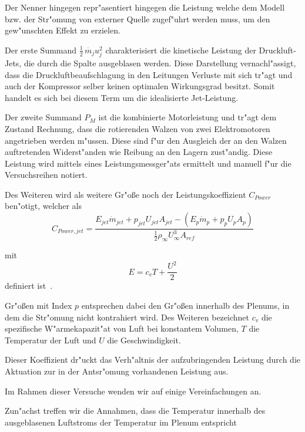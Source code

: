 Der Nenner hingegen repr"asentiert hingegen die Leistung welche dem Modell bzw. der Str"omung von externer Quelle zugef"uhrt werden muss, um den gew"unschten Effekt zu erzielen.

Der erste Summand $\frac{1}{2}\,\dot{m_j} u_j^2$ charakterisiert die kinetische Leistung der Druckluft-Jets, die durch die Spalte ausgeblasen werden. Diese Darstellung vernachl"assigt, dass die  Druckluftbeaufschlagung in den Leitungen Verluste mit sich tr"agt und auch der Kompressor selber keinen optimalen Wirkungsgrad besitzt. Somit handelt es sich bei diesem Term um die idealisierte Jet-Leistung.

Der zweite Summand $ P_M$ ist die kombinierte Motorleistung und tr"agt dem Zustand Rechnung, dass die rotierenden Walzen von zwei Elektromotoren angetrieben werden m"ussen. Diese sind f"ur den Ausgleich der an den Walzen auftretenden Widerst"anden wie Reibung an den Lagern zust"andig.
Diese Leistung wird mittels eines Leistungsmessger"ats ermittelt und manuell f"ur die Versuchsreihen notiert.


Des Weiteren wird als weitere Gr"o\ss{}e noch der Leistungskoeffizient $C_{Power}$ ben"otigt, welcher als
\begin{equation}
	\label{eq:def-powercoefficient}
	C_{Power,jet} = \frac{E_{jet}\dot{m}_{jet} + p_{jet}U_{jet}A_{jet} - (E_p\dot{m}_p + p_p U_p A_p)}{\frac{1}{2}\rho_{\infty}U^3_{\infty} A_{ref}}
\end{equation}

mit
\begin{equation}
	\label{eq:def-energieterm}
	E = c_vT + \frac{U^2}{2}
\end{equation}		
definiert ist~\cite{Hucho.2011}.

Gr"o\ss{}en mit Index $p$ entsprechen dabei den Gr"o\ss{}en innerhalb des Plenums, in dem die Str"omung nicht kontrahiert wird.
Des Weiteren bezeichnet $c_v$ die spezifische W"armekapazit"at von Luft bei konstantem Volumen, $T$ die Temperatur der Luft und $U$ die Geschwindigkeit.

Dieser Koeffizient dr"uckt das Verh"altnis der aufzubringenden Leistung durch die Aktuation zur in der Antsr"omung vorhandenen Leistung aus.

Im Rahmen dieser Versuche wenden wir auf  einige Vereinfachungen an. 

Zun"achst treffen wir die Annahmen, dass die Temperatur innerhalb des ausgeblasenen Luftstroms der Temperatur im Plenum entspricht

